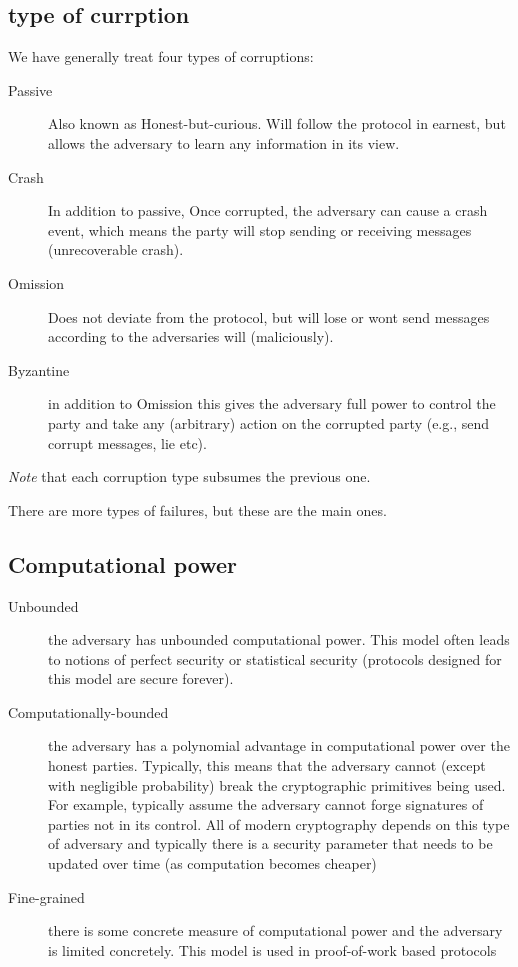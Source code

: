\subsection{type of currption}
We have generally treat four types of corruptions:
\begin{description}
    \item[Passive] Also known as Honest-but-curious.
    Will follow the protocol in earnest, but allows the adversary to learn any information in its view.
    \item[Crash] In addition to passive, Once corrupted, the adversary can cause a crash event, which 
    means the party will stop sending or receiving messages (unrecoverable crash).
    \item[Omission] Does not deviate from the protocol, 
    but will lose or wont send messages according to the adversaries will (maliciously).
    \item[Byzantine] in addition to Omission this gives the adversary full power to control the party and take any
     (arbitrary) action on the corrupted party (e.g., send corrupt messages, lie etc).
\end{description}

\emph{Note} that each corruption type subsumes the previous one.


There are more types of failures, but these are the main ones.

\subsection{Computational power}

\begin{description}
    \item[Unbounded] the adversary has unbounded computational power. 
    This model often leads to notions of perfect security or statistical security
    (protocols designed for this model are secure forever).

    \item[Computationally-bounded] the adversary has a polynomial advantage in computational power 
    over the honest parties. 
    Typically, this means that the adversary cannot (except with negligible probability) break the 
    cryptographic primitives being used. 
    For example, typically assume the adversary cannot forge signatures of parties not in its 
    control. All of modern cryptography depends on this type of adversary and typically 
    there is a security parameter that needs to be updated over time (as computation becomes cheaper)
    \item[Fine-grained] there is some concrete measure of computational power and the adversary is 
    limited concretely. This model is used in proof-of-work based protocols
\end{description}


